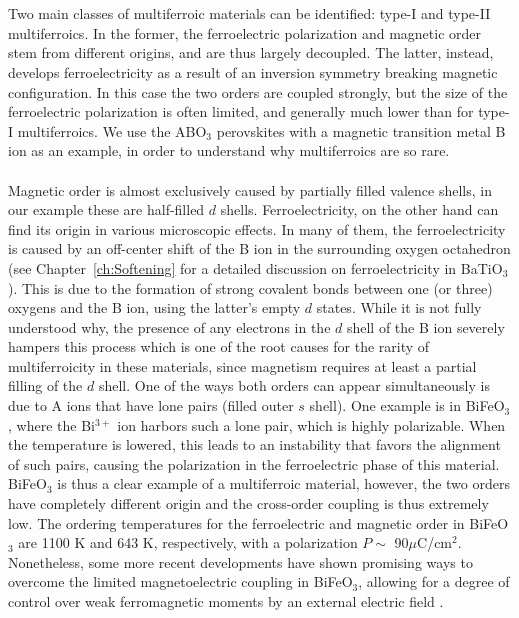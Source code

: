 \\\\
Two main classes of multiferroic materials can be identified: type-I and type-II multiferroics.
In the former, the ferroelectric polarization and magnetic order stem from different origins, and are thus largely decoupled.
The latter, instead, develops ferroelectricity as a result of an inversion symmetry breaking magnetic configuration.
In this case the two orders are coupled strongly, but the size of the ferroelectric polarization is often limited, and generally much lower than for type-I multiferroics.
We use the ABO$_3$ perovskites with a magnetic transition metal B ion as an example, in order to understand why multiferroics are so rare.
\\\\
Magnetic order is almost exclusively caused by partially filled valence shells, in our example these are half-filled $d$ shells.
Ferroelectricity, on the other hand can find its origin in various microscopic effects.
In many of them, the ferroelectricity is caused by an off-center shift of the B ion in the surrounding oxygen octahedron (see Chapter~\ref{ch:Softening} for a detailed discussion on ferroelectricity in BaTiO$_3$).
This is due to the formation of strong covalent bonds between one (or three) oxygens and the B ion, using the latter's empty $d$ states. 
While it is not fully understood why, the presence of any electrons in the $d$ shell of the B ion severely hampers this process which is one of the root causes for the rarity of multiferroicity in these materials, since magnetism requires at least a partial filling of the $d$ shell.
One of the ways both orders can appear simultaneously is due to A ions that have lone pairs (filled outer $s$ shell). One example is in BiFeO$_3$, where the Bi$^{3+}$ ion harbors such a lone pair, which is highly polarizable.
When the temperature is lowered, this leads to an instability that favors the alignment of such pairs, causing the polarization in the ferroelectric phase of this material.
BiFeO$_3$ is thus a clear example of a multiferroic material, however, the two orders have completely different origin and the cross-order coupling is thus extremely low.
The ordering temperatures for the ferroelectric and magnetic order in BiFeO$_3$ are 1100 K and 643 K, respectively, with a polarization $P \sim$ 90$\mu$C/cm$^2$.
Nonetheless, some more recent developments have shown promising ways to overcome the limited magnetoelectric coupling in BiFeO$_3$, allowing for a degree of control over weak ferromagnetic moments by an external electric field \cite{Heron14}. 

